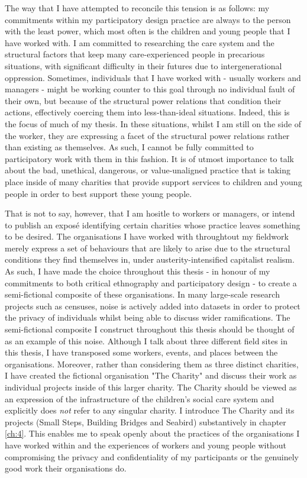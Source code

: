 The way that I have attempted to reconcile this tension is as follows: my commitments within my participatory design practice are always to the person with the least power, which most often is the children and young people that I have worked with. I am committed to researching the care system and the structural factors that keep many care-experienced people in precarious situations, with significant difficulty in their futures due to intergenerational oppression. Sometimes, individuals that I have worked with - usually workers and managers - might be working counter to this goal through no individual fault of their own, but because of the structural power relations that condition their actions, effectively coercing them into less-than-ideal situations. Indeed, this is the focus of much of my thesis. In these situations, whilst I am still on the side of the worker, they are expressing a facet of the structural power relations rather than existing as themselves. As such, I cannot be fully committed to participatory work with them in this fashion. It is of utmost importance to talk about the bad, unethical, dangerous, or value-unaligned practice that is taking place inside of many charities that provide support services to children and young people in order to best support these young people.

That is not to say, however, that I am hositle to workers or managers, or intend to publish an exposé identifying certain charities whose practice leaves something to be desired. The organisations I have worked with throughtout my fieldwork merely express a set of behaviours that are likely to arise due to the structural conditions they find themselves in, under austerity-intensified capitalist realism. As such, I have made the choice throughout this thesis - in honour of my commitments to both critical ethnography and participatory design - to create a semi-fictional composite of these organisations. In many large-scale research projects such as censuses, noise is actively added into datasets in order to protect the privacy of individuals whilst being able to discuss wider ramifications. The semi-fictional composite I construct throughout this thesis should be thought of as an example of this noise. Although I talk about three different field sites in this thesis, I have transposed some workers, events, and places between the organisations. Moreover, rather than considering them as three distinct charities, I have created the fictional organisation "The Charity" and discuss their work as individual projects inside of this larger charity. The Charity should be viewed as an expression of the infrastructure of the children's social care system and explicitly does \emph{not} refer to any singular charity. I introduce The Charity and its projects (Small Steps, Building Bridges and Seabird) substantively in chapter \ref{ch:4}. This enables me to speak openly about the practices of the organisations I have worked within and the experiences of workers and young people without compromising the privacy and confidentiality of my participants or the genuinely good work their organisations do.

